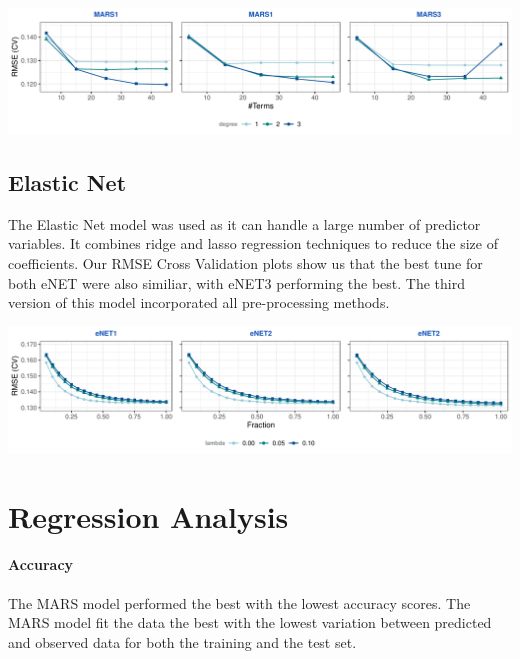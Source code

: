 \documentclass[]{report}
\begin{document}
\includegraphics{Proj2-JM_files/figure-latex/unnamed-chunk-7-1.pdf}

\hypertarget{elastic-net}{%
\section{Elastic Net}\label{elastic-net}}

The Elastic Net model was used as it can handle a large number of
predictor variables. It combines ridge and lasso regression techniques
to reduce the size of coefficients. Our RMSE Cross Validation plots show
us that the best tune for both eNET were also similiar, with eNET3
performing the best. The third version of this model incorporated all
pre-processing methods.

\includegraphics{Proj2-JM_files/figure-latex/unnamed-chunk-8-1.pdf}

\hypertarget{regression-analysis}{%
\chapter{Regression Analysis}\label{regression-analysis}}

\hypertarget{accuracy}{%
\subsubsection{Accuracy}\label{accuracy}}

The MARS model performed the best with the lowest accuracy scores. The
MARS model fit the data the best with the lowest variation between
predicted and observed data for both the training and the test set.
\end{document}
